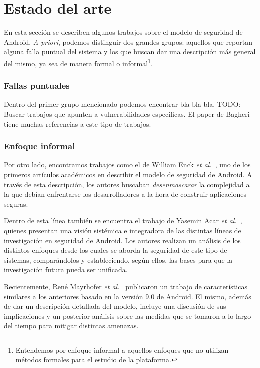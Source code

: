 
\chapter*{Estado del arte}
\label{chapter:estado}

En esta sección se describen algunos trabajos sobre el modelo de seguridad de
Android. \textit{A priori}, podemos distinguir dos grandes grupos: aquellos que
reportan alguna falla puntual del sistema y los que buscan dar una descripción
más general del mismo, ya sea de manera formal o informal\footnote{Entendemos
por enfoque informal a aquellos enfoques que no utilizan métodos formales para
el estudio de la plataforma.}.

\subsection*{Fallas puntuales}

Dentro del primer grupo mencionado podemos encontrar bla bla bla. TODO: Buscar
trabajos que apunten a vulnerabilidades específicas. El paper de Bagheri
\cite{bagheri} tiene muchas referencias a este tipo de trabajos.

\subsection*{Enfoque informal}

Por otro lado, encontramos trabajos como el de William Enck
\textit{et al.}~\cite{enck}, uno de los primeros artículos académicos en
describir el modelo de seguridad de Android. A través de esta descripción, los
autores buscaban \textit{desenmascarar} la complejidad a la que debían
enfrentarse los desarrolladores a la hora de construir aplicaciones seguras.

Dentro de esta línea también se encuentra el trabajo de Yasemin Acar \textit{et
al.}~\cite{sok}, quienes presentan una visión sistémica e integradora de las
distintas líneas de investigación en seguridad de Android. Los autores realizan
un análisis de los distintos enfoques desde los cuales se aborda la seguridad de
este tipo de sistemas, comparándolos y estableciendo, según ellos, las bases para
que la investigación futura pueda ser unificada.

Recientemente, René Mayrhofer \textit{et al.}~\cite{mayrhofer} publicaron un
trabajo de características similares a los anteriores basado en la versión 9.0
de Android. El mismo, además de dar un descripción detallada del modelo, incluye
una discusión de sus implicaciones y un posterior análisis sobre las medidas que
se tomaron a lo largo del tiempo para mitigar distintas amenazas.

